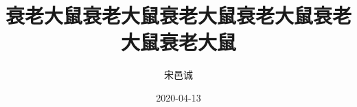 \documentclass[a4paper, 12pt, fontset=windows]{HBUThesis}
\date{2020-04-13}
\title{衰老大鼠衰老大鼠衰老大鼠衰老大鼠衰老大鼠衰老大鼠}
\author{宋邑诚}
\begin{document}
\makecover
\end{document}
